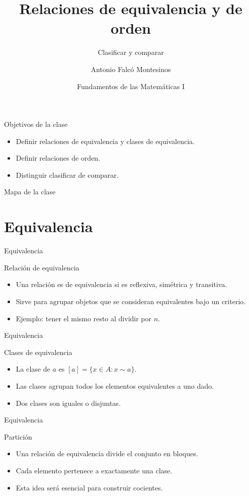 \documentclass[aspectratio=169,11pt]{beamer}
\title[FdM I -- Clase 11]{Relaciones de equivalencia y de orden}
\subtitle{Clasificar y comparar}
\author{Antonio Falcó Montesinos}
\institute{Universidad CEU Cardenal Herrera}
\date{Fundamentos de las Matemáticas I}
\begin{document}
\begin{frame}
  \titlepage
\end{frame}

\begin{frame}{Objetivos de la clase}
\begin{itemize}
  \item Definir relaciones de equivalencia y clases de equivalencia.
  \item Definir relaciones de orden.
  \item Distinguir clasificar de comparar.
\end{itemize}
\end{frame}

\begin{frame}{Mapa de la clase}
\tableofcontents
\end{frame}

\section{Equivalencia}

\begin{frame}{Equivalencia}
\begin{block}{Relación de equivalencia}
\begin{itemize}
  \item Una relación es de equivalencia si es reflexiva, simétrica y transitiva.
  \item Sirve para agrupar objetos que se consideran equivalentes bajo un criterio.
  \item Ejemplo: tener el mismo resto al dividir por \(n\).
\end{itemize}
\end{block}
\end{frame}

\begin{frame}{Equivalencia}
\begin{block}{Clases de equivalencia}
\begin{itemize}
  \item La clase de \(a\) es \([a]=\{x\in A:x\sim a\}\).
  \item Las clases agrupan todos los elementos equivalentes a uno dado.
  \item Dos clases son iguales o disjuntas.
\end{itemize}
\end{block}
\end{frame}

\begin{frame}{Equivalencia}
\begin{block}{Partición}
\begin{itemize}
  \item Una relación de equivalencia divide el conjunto en bloques.
  \item Cada elemento pertenece a exactamente una clase.
  \item Esta idea será esencial para construir cocientes.
\end{itemize}
\end{block}
\end{frame}
\end{document}
